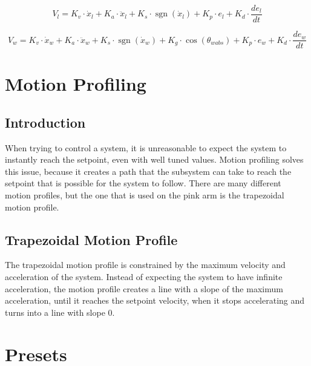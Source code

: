 \documentclass{scrartcl}
\DeclareMathOperator{\sgn}{sgn}
\begin{document}
\begin{equation} \label{Extension Control Equation}
    V_{l} = K_v \cdot \dot{x}_{l} + K_a \cdot \ddot{x}_{l} + K_s \cdot \sgn(\dot{x}_{l}) + K_p \cdot e_{l} + K_d \cdot \frac{de_{l}}{dt}
\end{equation}

\begin{equation} \label{Wrist Control Equation}
    V_{w} = K_v \cdot \dot{x}_{w} + K_a \cdot \ddot{x}_{w} + K_s \cdot \sgn(\dot{x}_{w}) + K_g \cdot \cos(\theta_{wabs}) + K_p \cdot e_{w} + K_d \cdot \frac{de_{w}}{dt}
\end{equation}

\section{Motion Profiling}

\subsection{Introduction}
When trying to control a system, it is unreasonable to expect the system to instantly reach the setpoint, even with well tuned values. Motion profiling solves this issue, because it creates a path that the subsystem can take to reach the setpoint that is possible for the system to follow. There are many different motion profiles, but the one that is used on the pink arm is the trapezoidal motion profile.

\subsection{Trapezoidal Motion Profile}
The trapezoidal motion profile is constrained by the maximum velocity and acceleration of the system. Instead of expecting the system to have infinite acceleration, the motion profile creates a line with a slope of the maximum acceleration, until it reaches the setpoint velocity, when it stops accelerating and turns into a line with slope 0.

\section{Presets}
\end{document}
